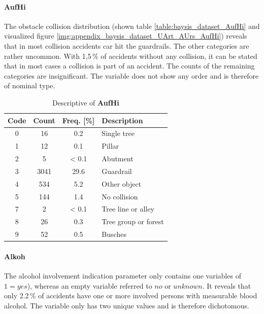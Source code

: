 \pagebreak

\paragraph{AufHi}
The obstacle collision distribution (shown table \autoref{table:baysis_dataset_AufHi} and visualized figure \autoref{img:appendix_baysis_dataset_UArt_AUrs_AufHi}) reveals that in most collision accidents car hit the guardrails. The other categories are rather uncommon. With 1,5\,\% of accidents without any collision, it can be stated that in most cases a collision is part of an accident. The counts of the remaining categories are insignificant. The variable does not show any order and is therefore of nominal type.
\begin{table}[ht]
	\centering
	\small
	\begin{tabular}{c|c|c|l} 
		\toprule
		Code & Count & Freq. [\%] & Description \\ 
		\midrule 
		0 & 16 		& 0.2	& Single tree \\
		1 & 12 		& 0.1	& Pillar \\
		2 & 5 		& < 0.1	& Abutment \\
		3 & 3041	& 29.6	& Guardrail \\
		4 & 534		& 5.2	& Other object \\
		5 & 144		& 1.4	& No collision \\
		7 & 2		& < 0.1	& Tree line or alley \\
		8 & 26		& 0.3	& Tree group or forest \\
		9 & 52		& 0.5	& Busches \\
		\bottomrule
	\end{tabular}
	\caption{Descriptive of \textbf{AufHi}}
	\label{table:baysis_dataset_AufHi}
	\vspace{-8mm}
\end{table}

\paragraph{Alkoh}
The alcohol involvement indication parameter only contains one variables of $1 = yes$), whereas an empty variable referred to $no$ or $unknown$. It reveals that only 2.2\,\% of accidents have one or more involved persons with measurable blood alcohol. The variable only has two unique values and is therefore dichotomous.

